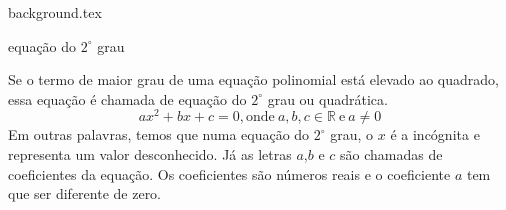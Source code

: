\documentclass[10pt]{article}
\begin{document}
    {background.tex} %
        \begin{center}
            {\LARGE {\sc equação do \( 2^\circ \) grau}}
        \end{center}



\begin{definicao}
    Se o termo de maior grau de uma equação polinomial está elevado ao quadrado, essa equação é chamada de equação do \( 2^\circ \) grau ou quadrática.
    \[ ax^2+bx+c = 0\mathrm{, onde}~ a,b,c \in \mathbb{R}  ~\mathrm{e}~ a \neq 0 \]
    Em outras palavras, temos que numa equação do \( 2^\circ \) grau, o \( x \) é a incógnita e representa um valor desconhecido. Já as letras \( a \),\( b \) e \( c \) são chamadas de coeficientes da equação. Os coeficientes são números reais e o coeficiente \( a \) tem que ser diferente de zero.
\end{definicao}
\end{document}
